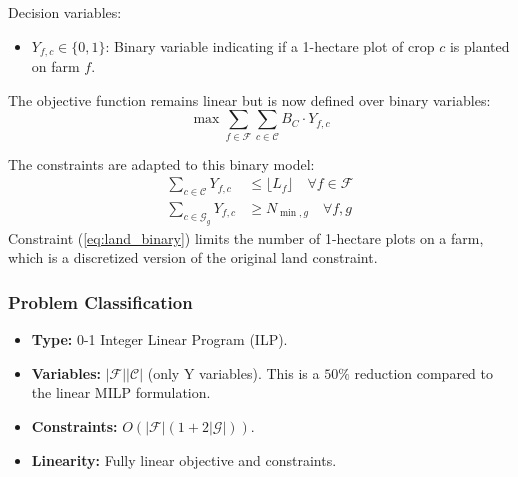 \documentclass{article}
\begin{document}
Decision variables:
\begin{itemize}
    \item $Y_{f,c} \in \{0,1\}$: Binary variable indicating if a 1-hectare plot of crop $c$ is planted on farm $f$.
\end{itemize}

The objective function remains linear but is now defined over binary variables:
\begin{equation}
\max \sum_{f \in \mathcal{F}} \sum_{c \in \mathcal{C}} B_C \cdot Y_{f,c}
\label{eq:bqubo_obj}
\end{equation}

The constraints are adapted to this binary model:
\begin{align}
\sum_{c \in \mathcal{C}} Y_{f,c} &\leq \lfloor L_f \rfloor \quad \forall f \in \mathcal{F} \label{eq:land_binary}\\
\sum_{c \in \mathcal{G}_g} Y_{f,c} &\geq N_{\min,g} \quad \forall f,g \label{eq:diversity_binary}
\end{align}
Constraint (\ref{eq:land_binary}) limits the number of 1-hectare plots on a farm, which is a discretized version of the original land constraint.

\subsubsection{Problem Classification}
\begin{itemize}
    \item \textbf{Type:} 0-1 Integer Linear Program (ILP).
    \item \textbf{Variables:} $|\mathcal{F}||\mathcal{C}|$ (only Y variables). This is a $50\%$ reduction compared to the linear MILP formulation.
    \item \textbf{Constraints:} $O(|\mathcal{F}|(1 + 2|\mathcal{G}|))$.
    \item \textbf{Linearity:} Fully linear objective and constraints.
\end{itemize}


\end{document}
